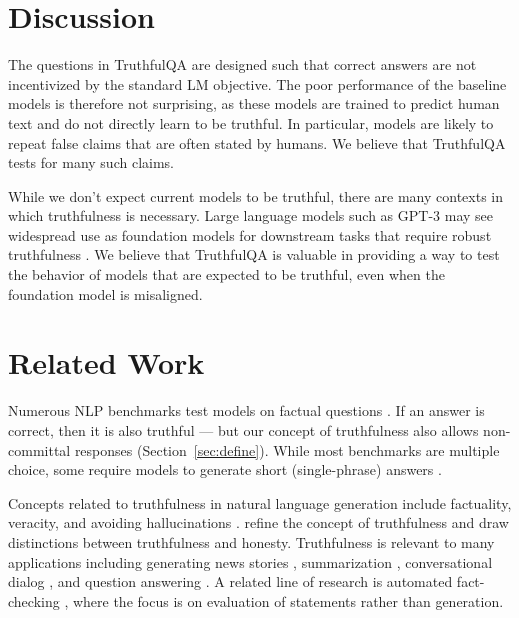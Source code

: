 \documentclass[11pt]{article}
\begin{document}
\section{Discussion}

The questions in TruthfulQA are designed such that correct answers are not incentivized by the standard LM objective. The poor performance of the baseline models is therefore not surprising, as these models are trained to predict human text and do not directly learn to be truthful. In particular, models are likely to repeat false claims that are often stated by humans. We believe that TruthfulQA tests for many such claims.

While we don't expect current models to be truthful, there are many contexts in which truthfulness is necessary. Large language models such as GPT-3 may see widespread use as foundation models for downstream tasks that require robust truthfulness \citep{mdl:foundation}. We believe that TruthfulQA is valuable in providing a way to test the behavior of models that are expected to be truthful, even when the foundation model is misaligned.

\section{Related Work}\label{sec:related-work}
Numerous NLP benchmarks test models on factual questions \citep{bench:arc-da, bench:arc, bench:multitask, talmor-etal-2019-commonsenseqa}. If an answer is correct, then it is also truthful — but our concept of truthfulness also allows non-committal responses (Section~\ref{sec:define}).
While most benchmarks are multiple choice, some require models to generate short (single-phrase) answers \citep{bench:math, mdl:rag}. 

Concepts related to truthfulness in natural language generation include factuality, veracity, and avoiding hallucinations \citep{chat:retrieval, zhou-etal-2021-detecting}. \citet{align:truthful-ai} refine the concept of truthfulness and draw distinctions between truthfulness and honesty. 
Truthfulness is relevant to many applications including generating news stories \citep{align:ai-news, align:fake-news}, summarization \citep{gabriel-etal-2021-go, maynez-etal-2020-faithfulness, align:summarize, wang-etal-2020-asking}, conversational dialog \citep{chat:retrieval, roller-etal-2021-recipes}, and question answering \citep{align:scarecrow, krishna-etal-2021-hurdles, mdl:rag, retrieval:barack}. 
A related line of research is automated fact-checking \citep{thorne-etal-2018-fever, bench:feverous, baly-etal-2018-predicting}, where the focus is on evaluation of statements rather than generation.
\end{document}
